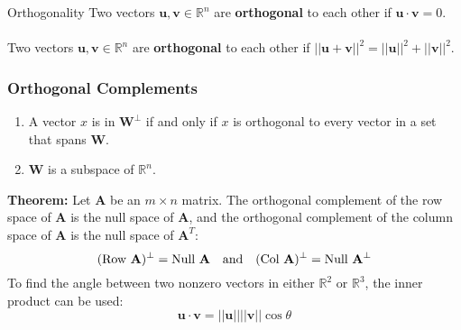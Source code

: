 \begin{defbox}{Orthogonality}
    Two vectors $\mathbf{u}, \mathbf{v} \in \mathbb{R}^n$ are \textbf{orthogonal} to each other if $\mathbf{u \cdot v} = 0$.\\\\
    Two vectors $\mathbf{u}, \mathbf{v} \in \mathbb{R}^n$ are \textbf{orthogonal} to each other if $||\mathbf{u} + \mathbf{v}||^2 = ||\mathbf{u}||^2 + ||\mathbf{v}||^2$.
    \subsubsection*{Orthogonal Complements}
    \begin{enumerate}
        \item A vector $x$ is in $\mathbf{W}^\perp$ if and only if $x$ is orthogonal to every vector in a set that spans $\mathbf{W}$.
        \item $\mathbf{W}$ is a subspace of $\mathbb{R}^n$.
    \end{enumerate}
    \textbf{Theorem:} Let $\mathbf{A}$ be an $m \times n$ matrix. The orthogonal complement of the row space of $\mathbf{A}$ is the null space of $\mathbf{A}$, and the orthogonal complement of the column space of $\mathbf{A}$ is the null space of $\mathbf{A}^T$:
    \[
        (\text{Row }\mathbf{A})^\perp = \text{Null }\mathbf{A} \text{\quad and\quad} (\text{Col }\mathbf{A})^\perp = \text{Null }\mathbf{A}^\perp
    \]
    To find the angle between two nonzero vectors in either $\mathbb{R}^2$ or $\mathbb{R}^3$, the inner product can be used:
    \[
        \mathbf{u \cdot v} = ||\mathbf{u}|| ||\mathbf{v}|| \cos{\theta}
    \]
\end{defbox}
